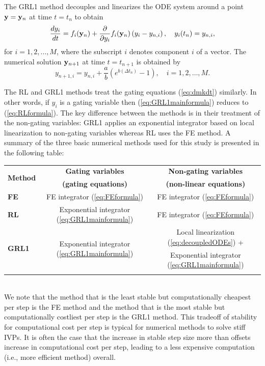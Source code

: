 \documentclass[landscape,a0b,final]{a0poster}
\newenvironment{poster}{
  \begin{center}
  \begin{minipage}[c]{0.98\textwidth}
}{
  \end{minipage} 
  \end{center}
}
\newenvironment{pcolumn}[1]{
  \begin{minipage}{#1\textwidth}
  \begin{center}
}{
  \end{center}
  \end{minipage}
}
\begin{document}
\begin{poster}
\begin{center}
\begin{pcolumn}{0.24}
{The GRL1 method decouples and linearizes the ODE system around a point
${\bf y}={\bf y}_n$ at time $t=t_n$ to obtain
\begin{equation}
   \frac{{d} y_{i}}{{d} t} = f_{i}({\bf y}_n) + \frac{\partial}{\partial y_{i}} f_{i} ({\bf y}_n)\left( y_{i} - y_{n,i} \right), \quad y_{i} (t_{n}) = y_{n,i},
\label{eq:decoupledODEs} 
\end{equation}
for $i=1, 2, \hdots, M$, where the subscript $i$ denotes component $i$ 
of a vector. The numerical solution ${\bf y}_{n+1}$ at time $t=t_{n+1}$ is obtained by
\begin{equation}
y_{n+1,i} = y_{n,i} + \frac{a}{b} \left( e^{ b ( \Delta t_{n})} - 1 \right), \quad  i=1, 2, \hdots, M.
\label{eq:GRL1mainformula}
\end{equation}

The RL and GRL1 methods treat the gating equations
(\ref{eq:dmkdt}) similarly. In other words, if $y_i$ is a
gating variable then (\ref{eq:GRL1mainformula}) reduces to
(\ref{eq:RLformula}). The key difference between the methods is in
their treatment of the non-gating variables: GRL1 applies an exponential
integrator based on local linearization to non-gating variables whereas
RL uses the FE method. A summary of the three basic numerical methods used for this study is
presented in the following table:

\vspace{0.5 cm} 
\begin{tabular}{|l|c|c|}\hline 
  \multirow{2}{*}{\bf{Method}} & \bf{Gating variables} & \bf{Non-gating variables}\\
  & \bf{(gating equations)} & \bf{(non-linear equations)}\\
  \hline
  \multirow{2}{*}{\bf{FE}} & \multirow{2}{*}{FE integrator (\ref{eq:FEformula})}
  & \multirow{2}{*}{FE integrator (\ref{eq:FEformula})}\\
  & &\\
  \hline
  \multirow{2}{*}{\bf{RL}} & \multirow{2}{*}{Exponential integrator (\ref{eq:GRL1mainformula})} &
  \multirow{2}{*}{FE integrator (\ref{eq:FEformula})}\\
  & &\\
  \hline
  \multirow{2}{*}{\bf{GRL1}} & \multirow{2}{*}{Exponential integrator (\ref{eq:GRL1mainformula})} & Local
  linearization (\ref{eq:decoupledODEs}) +\\
  &  & Exponential integrator (\ref{eq:GRL1mainformula})\\
  \hline
  \noalign{\smallskip}
\end{tabular}
\vspace{0.5 cm}
\\We note that the method
that is the least stable but computationally cheapest per step is the
FE method and the method that is the most stable but computationally
costliest per step is the GRL1 method. This tradeoff of stability for
computational cost per step is typical for numerical methods to solve
stiff IVPs. It is often the case that the increase in stable step size
more than offsets increase in computational cost per step, leading to
a less expensive computation (i.e., more efficient method) overall.

}
\end{pcolumn}
\end{center}
\end{poster}
\end{document}
